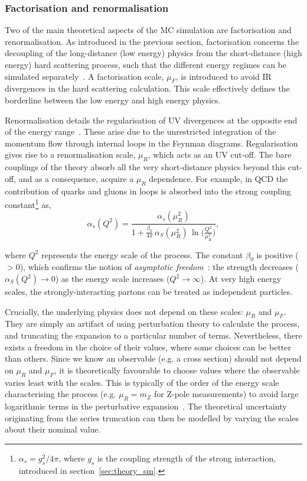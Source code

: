\subsubsection{Factorisation and renormalisation}
Two of the main theoretical aspects of the MC simulation are factorisation and renormalisation. As introduced in the previous section, factorisation concerns the decoupling of the long-distance (low energy) physics from the short-distance (high energy) hard scattering process, such that the different energy regimes can be simulated separately~\cite{doi:10.1146_annurev.nucl.55.090704.151505}. A factorisation scale, $\mu_F$, is introduced to avoid IR divergences in the hard scattering calculation. This scale effectively defines the borderline between the low energy and high energy physics.

Renormalisation details the regularisation of UV divergences at the opposite end of the energy range~\cite{Brock:1993sz}. These arise due to the unrestricted integration of the momentum flow through internal loops in the Feynman diagrams. Regularisation gives rise to a renormalisation scale, $\mu_R$, which acts as an UV cut-off. The bare couplings of the theory absorb all the very short-distance physics beyond this cut-off, and as a consequence, acquire a $\mu_R$ dependence. For example, in QCD the contribution of quarks and gluons in loops is absorbed into the strong coupling constant\footnote{$\alpha_s=g^2_s/4\pi$, where $g_s$ is the coupling strength of the strong interaction, introduced in section~\ref{sec:theory_sm}.} as,
\begin{equation}
    \alpha_s(Q^2) = \frac{\alpha_s(\mu_R^2)}{1+\frac{\beta_0}{4\pi}\,\alpha_S(\mu_R^2)\,\ln\Big(\frac{Q^2}{\mu_R^2}\Big)},
\end{equation}

\noindent
where $Q^2$ represents the energy scale of the process. The constant $\beta_0$ is positive (${>0}$), which confirms the notion of \textit{asymptotic freedom}~\cite{PhysRevLett.30.1343}: the strength decreases ($\alpha_S(Q^2) \rightarrow 0$) as the energy scale increases ($Q^2\rightarrow\infty$). At very high energy scales, the strongly-interacting partons can be treated as independent particles. 

Crucially, the underlying physics does not depend on these scales: $\mu_R$ and $\mu_F$. They are simply an artifact of using perturbation theory to calculate the process, and truncating the expansion to a particular number of terms. Nevertheless, there exists a freedom in the choice of their values, where some choices can be better than others. Since we know an observable (e.g. a cross section) should not depend on $\mu_R$ and $\mu_F$, it is theoretically favourable to choose values where the observable varies least with the scales. This is typically of the order of the energy scale characterising the process (e.g. $\mu_R = m_Z$ for Z-pole measurements) to avoid large logarithmic terms in the perturbative expansion~\cite{Buckley:2011ms}. The theoretical uncertainty originating from the series truncation can then be modelled by varying the scales about their nominal value.

